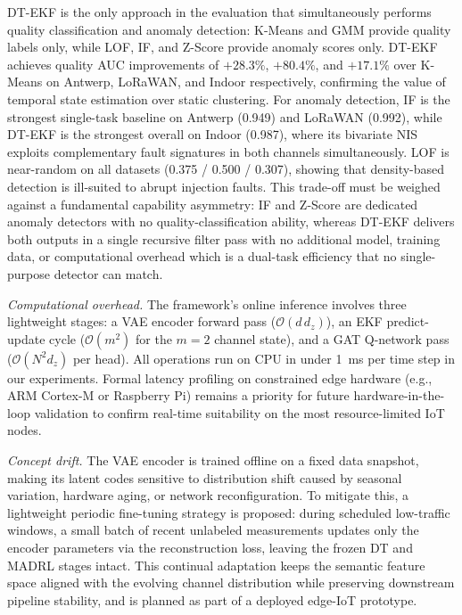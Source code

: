 \documentclass[conference]{IEEEtran}
\begin{document}
DT-EKF is the only approach in the evaluation that simultaneously
performs quality classification and anomaly detection: K-Means and GMM
provide quality labels only, while LOF, IF, and Z-Score provide anomaly
scores only.
DT-EKF achieves quality AUC improvements of $+28.3\%$, $+80.4\%$,
and $+17.1\%$ over K-Means on Antwerp, LoRaWAN, and Indoor respectively,
confirming the value of temporal state estimation over static clustering.
For anomaly detection, IF is the strongest single-task baseline on
Antwerp (0.949) and LoRaWAN (0.992), while DT-EKF is the strongest
overall on Indoor (0.987), where its bivariate NIS exploits
complementary fault signatures in both channels simultaneously.
LOF is near-random on all datasets (0.375 / 0.500 / 0.307), showing
that density-based detection is ill-suited to abrupt injection faults.
This trade-off must be weighed against a fundamental capability
asymmetry: IF and Z-Score are dedicated anomaly detectors with no
quality-classification ability, whereas DT-EKF delivers both outputs
in a single recursive filter pass with no additional model, training
data, or computational overhead which is a dual-task efficiency that
no single-purpose detector can match.

\textit{Computational overhead.}
The framework's online inference involves three lightweight stages:
a VAE encoder forward pass ($\mathcal{O}(d\,d_z)$), an EKF predict-update
cycle ($\mathcal{O}(m^2)$ for the $m{=}2$ channel state), and a GAT
Q-network pass ($\mathcal{O}(N^2 d_z)$ per head).
All operations run on CPU in under 1~ms per time step in our experiments.
Formal latency profiling on constrained edge hardware (e.g., ARM
Cortex-M or Raspberry Pi) remains a priority for future hardware-in-the-loop
validation to confirm real-time suitability on the most resource-limited IoT nodes.

\textit{Concept drift.}
The VAE encoder is trained offline on a fixed data snapshot, making its
latent codes sensitive to distribution shift caused by seasonal variation,
hardware aging, or network reconfiguration.
To mitigate this, a lightweight periodic fine-tuning strategy is proposed:
during scheduled low-traffic windows, a small batch of recent unlabeled
measurements updates only the encoder parameters via the reconstruction
loss, leaving the frozen DT and MADRL stages intact.
This continual adaptation keeps the semantic feature space aligned with
the evolving channel distribution while preserving downstream pipeline
stability, and is planned as part of a deployed edge-IoT prototype.
\end{document}
